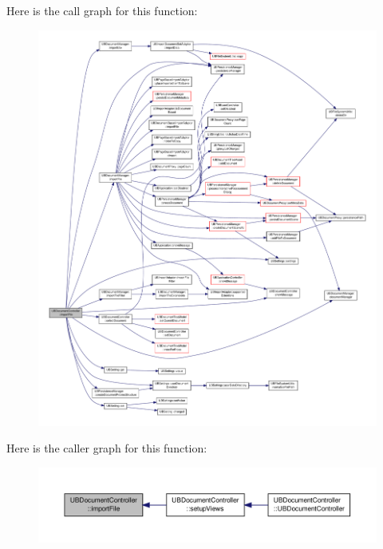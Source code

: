 Here is the call graph for this function\-:
\nopagebreak
\begin{figure}[H]
\begin{center}
\leavevmode
\includegraphics[width=350pt]{d6/de0/class_u_b_document_controller_af5065d414f3ca99eee1d7c21930bde29_cgraph}
\end{center}
\end{figure}




Here is the caller graph for this function\-:
\nopagebreak
\begin{figure}[H]
\begin{center}
\leavevmode
\includegraphics[width=350pt]{d6/de0/class_u_b_document_controller_af5065d414f3ca99eee1d7c21930bde29_icgraph}
\end{center}
\end{figure}


